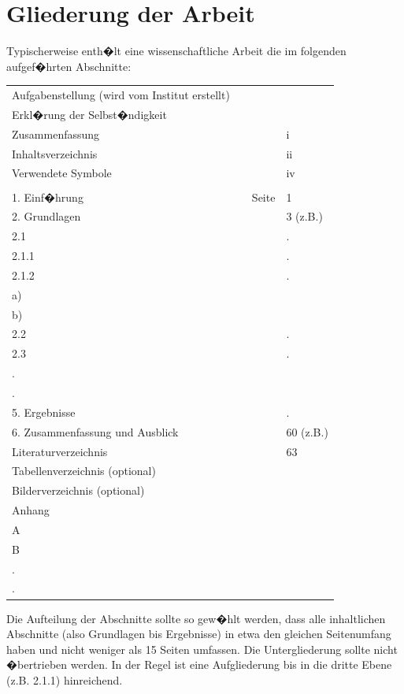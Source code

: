 \section{Gliederung der Arbeit\label{sec:kap_seiten}}
Typischerweise enth�lt eine wissenschaftliche Arbeit die im folgenden aufgef�hrten Abschnitte:

\begin{tabular}{lcll}
  Aufgabenstellung (wird vom Institut erstellt)   &\hspace{3cm} & &\\
  Erkl�rung der Selbst�ndigkeit &&&\\
  Zusammenfassung &  & &i \\
  Inhaltsverzeichnis & && ii\\
  Verwendete Symbole& & &iv\\
  \\
  1. Einf�hrung & &Seite& 1 \\
  2. Grundlagen&&& 3 (z.B.)\\
  \hspace{5mm} 2.1 & & &.       \\
  \hspace{10mm} 2.1.1& & &. \\
  \hspace{10mm} 2.1.2& & &.\\
  \hspace{20mm} a)\\
  \hspace{20mm} b)\\
  \hspace{5mm} 2.2& & &.\\
  \hspace{5mm} 2.3& & &.\\
  .\\
  .\\
  5. Ergebnisse& & &.\\
  6. Zusammenfassung und Ausblick&&& 60 (z.B.)\\
  Literaturverzeichnis &&&63\\
  Tabellenverzeichnis (optional)\\
  Bilderverzeichnis (optional)\\
  Anhang\\
  A\\
  B\\
  .\\
  .\\
\end{tabular}


Die Aufteilung der Abschnitte sollte so gew�hlt werden, dass alle inhaltlichen Abschnitte (also
Grundlagen bis Ergebnisse) in etwa den gleichen Seitenumfang haben und nicht weniger als 15 Seiten
umfassen. Die Untergliederung sollte nicht �bertrieben werden. In der Regel ist eine Aufgliederung
bis in die dritte Ebene (z.B. 2.1.1) hinreichend.




